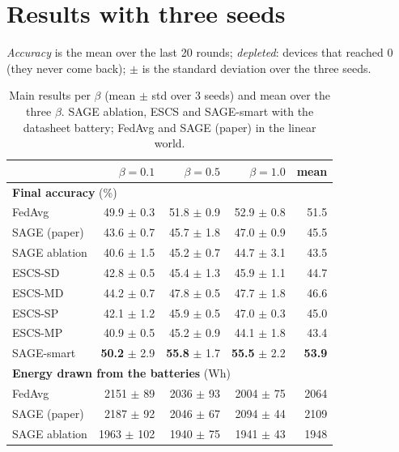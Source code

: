 \documentclass[11pt,a4paper]{article}
\begin{document}
\section{Results with three seeds}
\label{sec:results}

\emph{Accuracy} is the mean over the last 20 rounds; \emph{depleted}: devices
that reached 0 (they never come back); $\pm$ is the standard deviation over the
three seeds.

\begin{table}[H]
\centering
\small
\caption{Main results per $\beta$ (mean $\pm$ std over 3 seeds) and mean over
the three $\beta$. SAGE ablation, ESCS and SAGE-smart with the datasheet battery;
FedAvg and SAGE (paper) in the linear world.}
\label{tab:main}
\begin{tabular}{lrrrr}
\toprule
& $\beta=0.1$ & $\beta=0.5$ & $\beta=1.0$ & \textbf{mean} \\
\midrule
\multicolumn{5}{l}{\textbf{Final accuracy} (\%)} \\
\quad FedAvg          & 49.9 $\pm$ 0.3 & 51.8 $\pm$ 0.9 & 52.9 $\pm$ 0.8 & 51.5 \\
\quad SAGE (paper)    & 43.6 $\pm$ 0.7 & 45.7 $\pm$ 1.8 & 47.0 $\pm$ 0.9 & 45.5 \\
\quad SAGE ablation   & 40.6 $\pm$ 1.5 & 45.2 $\pm$ 0.7 & 44.7 $\pm$ 3.1 & 43.5 \\
\quad ESCS-SD         & 42.8 $\pm$ 0.5 & 45.4 $\pm$ 1.3 & 45.9 $\pm$ 1.1 & 44.7 \\
\quad ESCS-MD         & 44.2 $\pm$ 0.7 & 47.8 $\pm$ 0.5 & 47.7 $\pm$ 1.8 & 46.6 \\
\quad ESCS-SP         & 42.1 $\pm$ 1.2 & 45.9 $\pm$ 0.5 & 47.0 $\pm$ 0.3 & 45.0 \\
\quad ESCS-MP         & 40.9 $\pm$ 0.5 & 45.2 $\pm$ 0.9 & 44.1 $\pm$ 1.8 & 43.4 \\
\quad SAGE-smart      & \textbf{50.2} $\pm$ 2.9 & \textbf{55.8} $\pm$ 1.7 & \textbf{55.5} $\pm$ 2.2 & \textbf{53.9} \\
\midrule
\multicolumn{5}{l}{\textbf{Energy drawn from the batteries} (Wh)} \\
\quad FedAvg          & 2151 $\pm$ 89  & 2036 $\pm$ 93  & 2004 $\pm$ 75 & 2064 \\
\quad SAGE (paper)    & 2187 $\pm$ 92  & 2046 $\pm$ 67  & 2094 $\pm$ 44 & 2109 \\
\quad SAGE ablation   & 1963 $\pm$ 102 & 1940 $\pm$ 75  & 1941 $\pm$ 43 & 1948 \\

\end{tabular}
\end{table}
\end{document}
